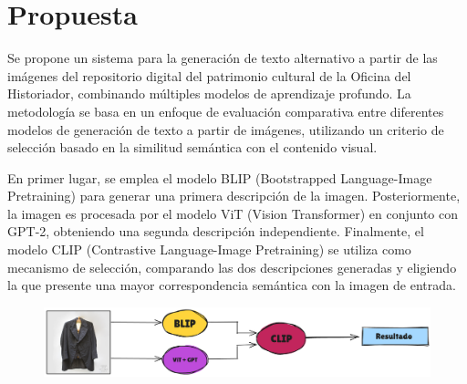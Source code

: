 
\chapter{Propuesta}\label{chapter:propuesta}
Se propone un sistema para la generación de texto alternativo a partir de las imágenes del repositorio digital del patrimonio cultural de la Oficina del Historiador, combinando múltiples modelos de aprendizaje profundo. La metodología se basa en un enfoque de evaluación comparativa entre diferentes modelos de generación de texto a partir de imágenes, utilizando un criterio de selección basado en la similitud semántica con el contenido visual.

En primer lugar, se emplea el modelo BLIP (Bootstrapped Language-Image Pretraining) para generar una primera descripción de la imagen. Posteriormente, la imagen es procesada por el modelo ViT (Vision Transformer) en conjunto con GPT-2, obteniendo una segunda descripción independiente. Finalmente, el modelo CLIP (Contrastive Language-Image Pretraining) se utiliza como mecanismo de selección, comparando las dos descripciones generadas y eligiendo la que presente una mayor correspondencia semántica con la imagen de entrada.

\begin{figure}
	\centering
	\includegraphics[width=1\linewidth]{./Graphics/diagrama}
	\caption{}
	\label{fig:diagrama}
\end{figure}

